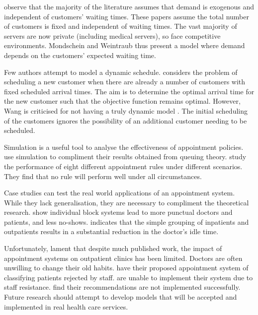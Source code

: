 \citet{Mondschein} observe that the majority of the literature assumes that demand is exogenous and independent of customers' waiting times. These papers assume the total number of customers is fixed and independent of waiting times. The vast majority of servers are now private (including medical servers), so face competitive environments. Mondschein and Weintraub thus present a model where demand depends on the customers' expected waiting time.

Few authors attempt to model a dynamic schedule. \citet{Wang} considers the problem of scheduling a new customer when there are already a number of customers with fixed scheduled arrival times. The aim is to determine the optimal arrival time for the new customer such that the objective function remains optimal. However, Wang is criticised for not having a truly dynamic model \citep{Erdogan}. The initial scheduling of the customers ignores the possibility of an additional customer needing to be scheduled.

Simulation is a useful tool to analyse the effectiveness of appointment policies. \citet{Kao} use simulation to compliment their results obtained from queuing theory. \citet{Ho} study the performance of eight different appointment rules under different scenarios. They find that no rule will perform well under all circumstances.

Case studies can test the real world applications of an appointment system. While they lack generalisation, they are necessary to compliment the theoretical research. \citet{Rockart} show individual block systems lead to more punctual doctors and patients, and less no-shows. \citet{Walter} indicates that the simple grouping of inpatients and outpatients results in a substantial reduction in the doctor's idle time.

Unfortunately, \citet{Cayirli} lament that despite much published work, the impact of appointment systems on outpatient clinics has been limited. Doctors are often unwilling to change their old habits. \citet{O'Keefe} have their proposed appointment system of classifying patients rejected by staff. \citet{Huarng} are unable to implement their system due to staff resistance. \citet{Bennett} find their recommendations are not implemented successfully. Future research should attempt to develop models that will be accepted and implemented in real health care services.
